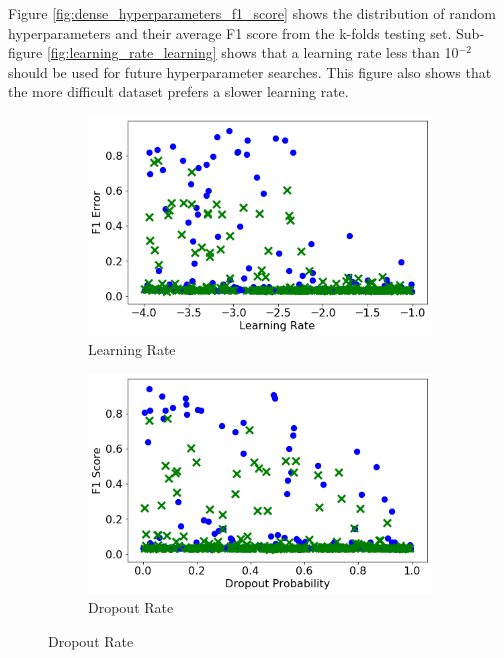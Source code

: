 Figure \ref{fig:dense_hyperparameters_f1_score} shows the distribution of random hyperparameters and their average F1 score from the k-folds testing set. Sub-figure \ref{fig:learning_rate_learning} shows that a learning rate less than 10$^{-2}$ should be used for future hyperparameter searches. This figure also shows that the more difficult dataset prefers a slower learning rate. 


\begin{figure}[H]
     \centering
     \begin{subfigure}[b]{0.49\textwidth}
         \centering
         \includegraphics[width=\textwidth]{images/dnn_learning_rate.png}
         \caption{Learning Rate}
         \label{fig:dnn_learning_rate}
     \end{subfigure}
     \hfill
     \begin{subfigure}[b]{0.49\textwidth}
         \centering
         \includegraphics[width=\textwidth]{images/dnn_dropout.png}
         \caption{Dropout Rate}
         \label{fig:dnn_dropout}
     \end{subfigure}


\end{figure}
